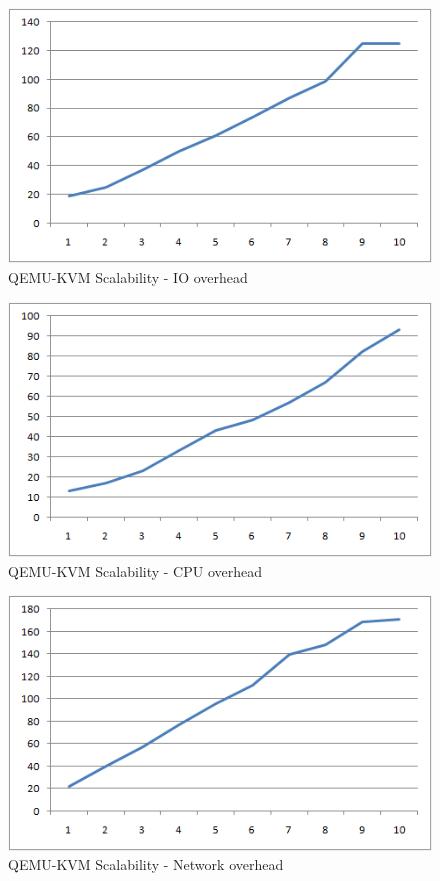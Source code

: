\begin{figure}[ht]
\begin{center}
\includegraphics[scale=0.5]{img/io}
\end{center}
\caption{QEMU-KVM Scalability - IO overhead}
\label{fig1}
\end{figure}
\begin{figure}[ht]
\begin{center}
\includegraphics[scale=0.5]{img/cpu}
\end{center}
\caption{QEMU-KVM Scalability - CPU overhead}
\label{fig2}
\end{figure}
\begin{figure}[ht]
\begin{center}
\includegraphics[scale=0.5]{img/net}
\end{center}
\caption{QEMU-KVM Scalability - Network overhead}
\label{fig3}
\end{figure}


